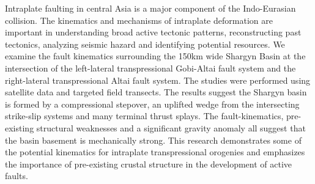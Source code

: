 \begin{abstractpage}
Intraplate faulting in central Asia is a major component of the Indo-Eurasian collision. The kinematics and mechanisms of intraplate deformation are important in understanding broad active tectonic patterns, reconstructing past tectonics, analyzing seismic hazard and identifying potential resources. We examine the fault kinematics surrounding the 150km wide Shargyn Basin at the intersection of the left-lateral transpressional Gobi-Altai fault system and the right-lateral transpressional Altai fault system. The studies were performed using satellite data and targeted field transects. The results suggest the Shargyn basin is formed by a compressional stepover, an uplifted wedge from the intersecting strike-slip systems and many terminal thrust splays. The fault-kinematics, pre-existing structural weaknesses and a significant gravity anomaly all suggest that the basin basement is mechanically strong. This research demonstrates some of the potential kinematics for intraplate transpressional orogenies and emphasizes the importance of pre-existing crustal structure in the development of active faults.
\end{abstractpage}
